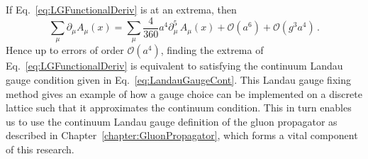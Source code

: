 %
If Eq.~\eqref{eq:LGFunctionalDeriv} is at an extrema, then 
%
\begin{equation}
\sum_\mu \partial_\mu A_\mu(x) = \sum_\mu \frac{4}{360}a^4 \partial_\mu^5\,A_\mu(x) + \mathcal{O}(a^6)+\mathcal{O}(g^3a^4)\, .
\end{equation}
%
Hence up to errors of order $\mathcal{O}(a^4)$, finding the extrema of Eq.~\eqref{eq:LGFunctionalDeriv} is equivalent to satisfying the continuum Landau gauge condition given in Eq.~\eqref{eq:LandauGaugeCont}. This Landau gauge fixing method gives an example of how a gauge choice can be implemented on a discrete lattice such that it approximates the continuum condition. This in turn enables us to use the continuum Landau gauge definition of the gluon propagator as described in Chapter~\ref{chapter:GluonPropagator}, which forms a vital component of this research.
